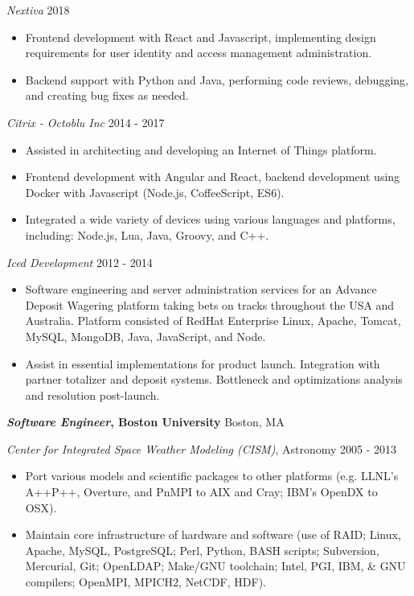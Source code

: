 \documentclass[line,margin]{res}
\begin{document}
\begin{resume}
          {\sl Nextiva} \hfill 2018
          \begin{itemize} \itemsep -2pt
          \item
            Frontend development with React and Javascript, implementing design requirements for user identity and 
            access management administration.
          \item
            Backend support with Python and Java, performing code reviews, debugging, and creating bug fixes as needed.
          \end{itemize}

          {\sl Citrix - Octoblu Inc} \hfill 2014 - 2017
          \begin{itemize} \itemsep -2pt
          \item
            Assisted in architecting and developing an Internet of Things platform.
          \item
            Frontend development with Angular and React, backend development using Docker with Javascript (Node.js, CoffeeScript, ES6).
          \item
            Integrated a wide variety of devices using various languages and platforms, including: Node.js, Lua, Java, Groovy, and C++.
          \end{itemize}

          {\sl Iced Development} \hfill 2012 - 2014
          \begin{itemize} \itemsep -2pt
          \item
            Software engineering and server administration services for an Advance Deposit Wagering platform taking bets on tracks throughout the USA and Australia. Platform consisted of RedHat Enterprise Linux, Apache, Tomcat, MySQL, MongoDB, Java, JavaScript, and Node.
          \item
            Assist in essential implementations for product launch. Integration with partner totalizer and deposit systems. Bottleneck and optimizations analysis and resolution post-launch.
          \end{itemize}

          {\bf \emph{Software Engineer}, Boston University} \hfill Boston, MA

          {\sl Center for Integrated Space Weather Modeling (CISM)}, Astronomy \hfill 2005 - 2013
          \begin{itemize} \itemsep -2pt %
          \item
            Port various models and scientific packages to other platforms (e.g. LLNL's A++P++, Overture, and PnMPI to AIX and Cray; IBM's OpenDX to OSX).
          \item
            Maintain core infrastructure of hardware and software (use of RAID; Linux, Apache, MySQL, PostgreSQL; Perl, Python, BASH scripts; Subversion, Mercurial, Git; OpenLDAP; Make/GNU toolchain; Intel, PGI, IBM, \& GNU compilers; OpenMPI, MPICH2, NetCDF, HDF).
          \end{itemize}


\end{resume}
\end{document}
